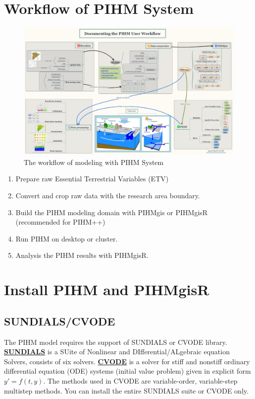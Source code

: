 \documentclass[]{scrbook}
\providecommand{\tightlist}{%
  \setlength{\itemsep}{0pt}\setlength{\parskip}{0pt}}
\begin{document}
\chapter{Workflow of PIHM System}\label{workflow-of-pihm-system}

\begin{figure}
\centering
\includegraphics{./Fig/Workflow.png}
\caption{The workflow of modeling with PIHM System}
\end{figure}

\begin{enumerate}
\def\labelenumi{\arabic{enumi}.}
\tightlist
\item
  Prepare raw Essential Terrestrial Variables (ETV)
\item
  Convert and crop raw data with the research area boundary.
\item
  Build the PIHM modeling domain with PIHMgis or PIHMgisR (recommended
  for PIHM++)
\item
  Run PIHM on desktop or cluster.
\item
  Analysis the PIHM results with PIHMgisR.
\end{enumerate}

\chapter{Install PIHM and PIHMgisR}\label{install-pihm-and-pihmgisr}

\section{SUNDIALS/CVODE}\label{sundialscvode}

The PIHM model requires the support of SUNDIALS or CVODE library.
\href{https://computation.llnl.gov/projects/sundials}{\textbf{SUNDIALS}}
is a SUite of Nonlinear and DIfferential/ALgebraic equation Solvers,
consists of six solvers.
\href{https://computation.llnl.gov/projects/sundials/cvode}{\textbf{CVODE}}
is a solver for stiff and nonstiff ordinary differential equation (ODE)
systems (initial value problem) given in explicit form \(y' = f(t,y)\).
The methods used in CVODE are variable-order, variable-step multistep
methods. You can install the entire SUNDIALS suite or CVODE only.
\end{document}
